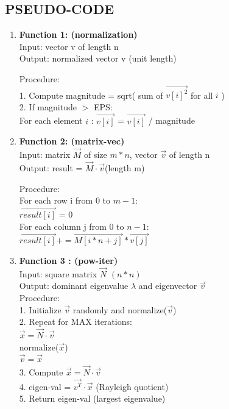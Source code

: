 \documentclass[journal,12pt,onecolumn]{IEEEtran}
\theoremstyle{remark}
\begin{document}
\subsection{PSEUDO-CODE}
\vspace{1em}
\begin{justify}
    \begin{enumerate}
        \item \textbf{Function 1: (normalization)}\\
        \vspace{0.5em}
        Input: vector v of length n \\
      Output: normalized vector v (unit length)

     Procedure:\\
    1. Compute magnitude = sqrt( sum of $\vec{v[i]^2}$ for all $i$ ) \\
    2. If magnitude $>$ EPS:\\
      For each element $i$ :
          $\vec{v[i]}$ = $\vec{v[i]}$ / magnitude
\vspace{0.5em}
 \item \textbf{Function 2: (matrix-vec)}\\
 \vspace{0.5em}
Input: matrix $\vec{M}$ of size $m*n$, vector $\vec{v}$ of length n \\
Output: result = $\vec{M} \cdot \vec{v} $(length m)

Procedure:\\
For each row i from 0 to $m-1$:\\
$\vec{result[i]}$ = 0\\
For each column j from 0 to $n-1$:\\
$\vec{result[i]} += \vec{M[i*n + j]} * \vec{v[j]}$

 \vspace{0.5em}
\item \textbf{Function 3 : (pow-iter)}\\
 \vspace{0.5em}
Input: square matrix $\vec{N}$ $(n*n)$\\
Output: dominant eigenvalue $\lambda$ and eigenvector $\vec{v}$\\

Procedure:\\
1. Initialize $\vec{v}$ randomly and normalize($\vec{v}$)\\
2. Repeat for MAX iterations:\\
      $\vec{x} = \vec{N} \cdot \vec{v} $ \\
      normalize($\vec{x}$)\\
      $\vec{v} = \vec{x}$\\
3. Compute $\vec{x} = \vec{N}\cdot \vec{v}$\\
4. eigen-val = $\vec{v^T}\cdot\vec{x}$   (Rayleigh quotient)\\
5. Return eigen-val  (largest eigenvalue)


\end{enumerate}
\end{justify}
\end{document}

